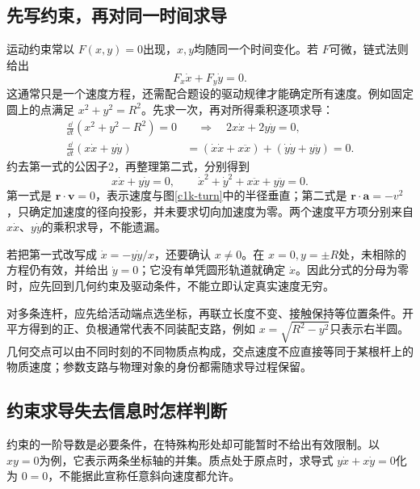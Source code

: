 \subsection{先写约束，再对同一时间求导}
运动约束常以 $F(x,y)=0$出现，$x,y$均随同一个时间变化。若 $F$可微，链式法则给出
\[F_x\dot x+F_y\dot y=0.\]
这通常只是一个速度方程，还需配合题设的驱动规律才能确定所有速度。例如固定圆上的点满足 $x^2+y^2=R^2$。先求一次，再对所得乘积逐项求导：
\begin{align*}
\frac{\dd}{\dd t}(x^2+y^2-R^2)=0
&\quad\Longrightarrow\quad 2x\dot x+2y\dot y=0,\\
\frac{\dd}{\dd t}(x\dot x+y\dot y)
&=(\dot x\dot x+x\ddot x)+(\dot y\dot y+y\ddot y)=0.
\end{align*}
约去第一式的公因子$2$，再整理第二式，分别得到
\[
x\dot x+y\dot y=0,\qquad
\dot x^2+\dot y^2+x\ddot x+y\ddot y=0.
\]
第一式是 $\bm r\cdot\bm v=0$，表示速度与图\ref{c1k-turn}中的半径垂直；第二式是 $\bm r\cdot\bm a=-v^2$，只确定加速度的径向投影，并未要求切向加速度为零。两个速度平方项分别来自 $x\dot x$、$y\dot y$的乘积求导，不能遗漏。

若把第一式改写成 $\dot x=-y\dot y/x$，还要确认 $x\ne0$。在 $x=0,y=\pm R$处，未相除的方程仍有效，并给出 $\dot y=0$；它没有单凭圆形轨道就确定 $\dot x$。因此分式的分母为零时，应先回到几何约束及驱动条件，不能立即认定真实速度无穷。

对多条连杆，应先给活动端点选坐标，再联立长度不变、接触保持等位置条件。开平方得到的正、负根通常代表不同装配支路，例如 $x=\sqrt{R^2-y^2}$只表示右半圆。几何交点可以由不同时刻的不同物质点构成，交点速度不应直接等同于某根杆上的物质速度；参数支路与物理对象的身份都需随求导过程保留。

\subsection{约束求导失去信息时怎样判断}
约束的一阶导数是必要条件，在特殊构形处却可能暂时不给出有效限制。以 $xy=0$为例，它表示两条坐标轴的并集。质点处于原点时，求导式 $y\dot x+x\dot y=0$化为 $0=0$，不能据此宣称任意斜向速度都允许。

